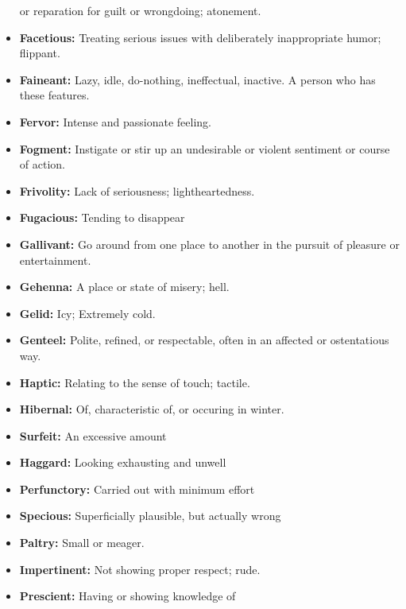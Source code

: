 \documentclass[crop=false,class=book]{standalone}
\begin{document}
\begin{itemize}[noitemsep]
                      or reparation for guilt or wrongdoing; atonement.
                \item \textbf{Facetious:} Treating serious issues with
                      deliberately inappropriate humor; flippant.
                \item \textbf{Faineant:} Lazy, idle, do-nothing,
                      ineffectual, inactive. A person who has these features.
                \item \textbf{Fervor:} Intense and passionate feeling.
                \item \textbf{Fogment:} Instigate or stir up an undesirable
                      or violent sentiment or course of action.
                \item \textbf{Frivolity:} Lack of seriousness;
                      lightheartedness.
                \item \textbf{Fugacious:} Tending to disappear
                \item \textbf{Gallivant:} Go around from one place to
                      another in the pursuit of pleasure or entertainment.
                \item \textbf{Gehenna:} A place or state of misery; hell.
                \item \textbf{Gelid:} Icy; Extremely cold.
                \item \textbf{Genteel:} Polite, refined, or respectable, often
                      in an affected or ostentatious way.
                \item \textbf{Haptic:} Relating to the sense of touch;
                      tactile.
                \item \textbf{Hibernal:} Of, characteristic of, or
                      occuring in winter.
                \item \textbf{Surfeit:} An excessive amount
                \item \textbf{Haggard:} Looking exhausting and unwell
                \item \textbf{Perfunctory:} Carried out with minimum effort
                \item \textbf{Specious:} Superficially plausible, but
                      actually wrong
                \item \textbf{Paltry:} Small or meager.
                \item \textbf{Impertinent:} Not showing proper respect; rude.
                \item \textbf{Prescient:} Having or showing knowledge of

\end{itemize}
\end{document}

